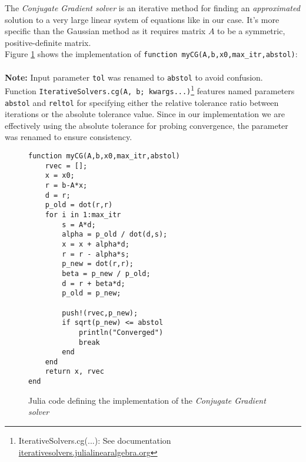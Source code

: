 \documentclass[unicode,11pt,a4paper,oneside,numbers=endperiod,openany]{scrartcl}
\begin{document}
The \textit{Conjugate Gradient solver} is an iterative method for finding an \textit{approximated} solution to a very large linear system of equations like in our case. It's more specific than the Gaussian method as it requires matrix $A$ to be a symmetric, positive-definite matrix.\\

Figure \ref{fig:myCG} shows the implementation of \verb|function myCG(A,b,x0,max_itr,abstol)|:\\\\
\textbf{Note:} Input parameter \verb|tol| was renamed to \verb|abstol| to avoid confusion.\\
Function \verb|IterativeSolvers.cg(A, b; kwargs...)|\footnote{IterativeSolvers.cg(...): See documentation 
\href{https://iterativesolvers.julialinearalgebra.org/stable/linear_systems/cg/\#CG}{iterativesolvers.julialinearalgebra.org} 
} features named parameters \verb|abstol| and \verb|reltol| for specifying either the relative tolerance ratio between iterations or the absolute tolerance value. Since in our implementation we are effectively using the absolute tolerance for probing convergence, the parameter was renamed to ensure consistency.\\

\begin{figure}[h!]
    \begin{verbatim}
function myCG(A,b,x0,max_itr,abstol)
    rvec = [];
    x = x0;
    r = b-A*x;
    d = r;
    p_old = dot(r,r)
    for i in 1:max_itr
        s = A*d;
        alpha = p_old / dot(d,s);
        x = x + alpha*d;
        r = r - alpha*s;
        p_new = dot(r,r);
        beta = p_new / p_old;
        d = r + beta*d;
        p_old = p_new;
        
        push!(rvec,p_new);
        if sqrt(p_new) <= abstol
            println("Converged")
            break
        end
    end
    return x, rvec
end
\end{verbatim}

    \caption{Julia code defining the implementation of the \textit{Conjugate Gradient solver} }
    \label{fig:myCG}
\end{figure}
\end{document}
